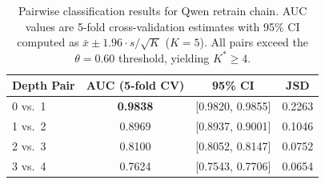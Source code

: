 \begin{table}[t]
\centering
\caption{Pairwise classification results for Qwen retrain chain. AUC values are 5-fold cross-validation estimates with 95\% CI computed as $\bar{x} \pm 1.96 \cdot s / \sqrt{K}$ ($K{=}5$). All pairs exceed the $\theta{=}0.60$ threshold, yielding $K^*{\geq}4$.}
\label{tab:qwen-retrain-chain}
\begin{tabular}{lccc}
\toprule
Depth Pair & AUC (5-fold CV) & 95\% CI & JSD \\
\midrule
0 vs.\ 1 & \textbf{0.9838} & [0.9820, 0.9855] & 0.2263 \\
1 vs.\ 2 & 0.8969 & [0.8937, 0.9001] & 0.1046 \\
2 vs.\ 3 & 0.8100 & [0.8052, 0.8147] & 0.0752 \\
3 vs.\ 4 & 0.7624 & [0.7543, 0.7706] & 0.0654 \\
\bottomrule
\end{tabular}
\end{table}
